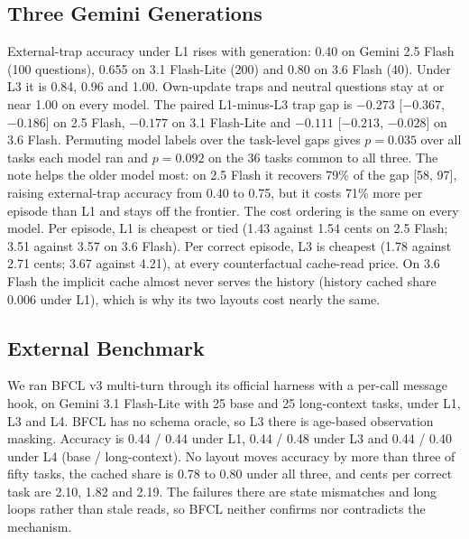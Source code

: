 \subsection{Three Gemini Generations}
External-trap accuracy under L1 rises with generation: 0.40 on Gemini 2.5 Flash (100 questions), 0.655 on 3.1 Flash-Lite (200) and 0.80 on 3.6 Flash (40). Under L3 it is 0.84, 0.96 and 1.00. Own-update traps and neutral questions stay at or near 1.00 on every model. The paired L1-minus-L3 trap gap is $-0.273$ [$-0.367$, $-0.186$] on 2.5 Flash, $-0.177$ on 3.1 Flash-Lite and $-0.111$ [$-0.213$, $-0.028$] on 3.6 Flash. Permuting model labels over the task-level gaps gives $p = 0.035$ over all tasks each model ran and $p = 0.092$ on the 36 tasks common to all three. The note helps the older model most: on 2.5 Flash it recovers 79\% of the gap [58, 97], raising external-trap accuracy from 0.40 to 0.75, but it costs 71\% more per episode than L1 and stays off the frontier. The cost ordering is the same on every model. Per episode, L1 is cheapest or tied (1.43 against 1.54 cents on 2.5 Flash; 3.51 against 3.57 on 3.6 Flash). Per correct episode, L3 is cheapest (1.78 against 2.71 cents; 3.67 against 4.21), at every counterfactual cache-read price. On 3.6 Flash the implicit cache almost never serves the history (history cached share 0.006 under L1), which is why its two layouts cost nearly the same.

\subsection{External Benchmark}
We ran BFCL v3 multi-turn \citep{patil2025bfcl} through its official harness with a per-call message hook, on Gemini 3.1 Flash-Lite with 25 base and 25 long-context tasks, under L1, L3 and L4. BFCL has no schema oracle, so L3 there is age-based observation masking. Accuracy is 0.44 / 0.44 under L1, 0.44 / 0.48 under L3 and 0.44 / 0.40 under L4 (base / long-context). No layout moves accuracy by more than three of fifty tasks, the cached share is 0.78 to 0.80 under all three, and cents per correct task are 2.10, 1.82 and 2.19. The failures there are state mismatches and long loops rather than stale reads, so BFCL neither confirms nor contradicts the mechanism.

